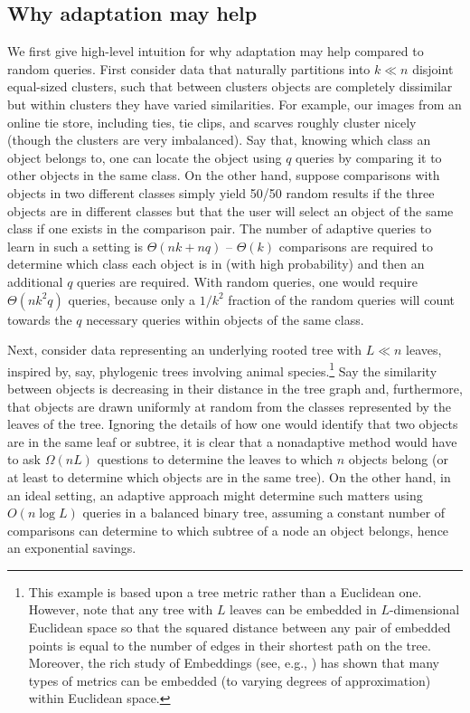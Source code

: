 \documentclass{article}
\begin{document}
\subsection{Why adaptation may help}
We first give high-level intuition for why adaptation may help compared to random queries.  First consider data that naturally partitions into $k \ll n$ disjoint equal-sized clusters, such that between clusters objects are completely dissimilar but within clusters they have varied similarities.  For example, our images from an online tie store, including ties, tie clips, and scarves roughly cluster nicely (though the clusters are very imbalanced).  Say that, knowing which class an object belongs to, one can locate the object using $q$ queries by comparing it to other objects in the same class.  On the other hand, suppose comparisons with objects in two different classes simply yield 50/50 random results if the three objects are in different classes but that the user will select an object of the same class if one exists in the comparison pair.  The number of adaptive queries to learn in such a setting is $\Theta(nk+nq)$ -- $\Theta(k)$ comparisons are required to determine which class each object is in (with high probability) and then an additional $q$ queries are required.  With random queries, one would require $\Theta(n k^2 q)$ queries, because only a $1/k^2$ fraction of the random queries will count towards the $q$ necessary queries within objects of the same class.


Next, consider data representing an underlying rooted tree with $L \ll n$ leaves, inspired by, say, phylogenic trees involving animal species.\footnote{This example is based upon a tree metric rather than a Euclidean one.  However, note that any tree with $L$ leaves can be embedded in $L$-dimensional Euclidean space so that the squared distance between any pair of embedded points is equal to the number of edges in their shortest path on the tree.  Moreover, the rich study of Embeddings (see, e.g., \citealp{IM04}) has shown that many types of metrics can be embedded (to varying degrees of approximation) within Euclidean space.}  Say the similarity between objects is decreasing in their distance in the tree graph and, furthermore, that objects are drawn uniformly at random from the classes represented by the leaves of the tree.  Ignoring the details of how one would identify that two objects are in the same leaf or subtree, it is clear that a nonadaptive method would have to ask $\Omega(n L)$ questions to determine the leaves to which $n$ objects belong (or at least to determine which objects are in the same tree).  On the other hand, in an ideal setting, an adaptive approach might determine such matters using $O(n \log L)$ queries in a balanced binary tree, assuming a constant number of comparisons can determine to which subtree of a node an object belongs, hence an exponential savings.
\end{document}
